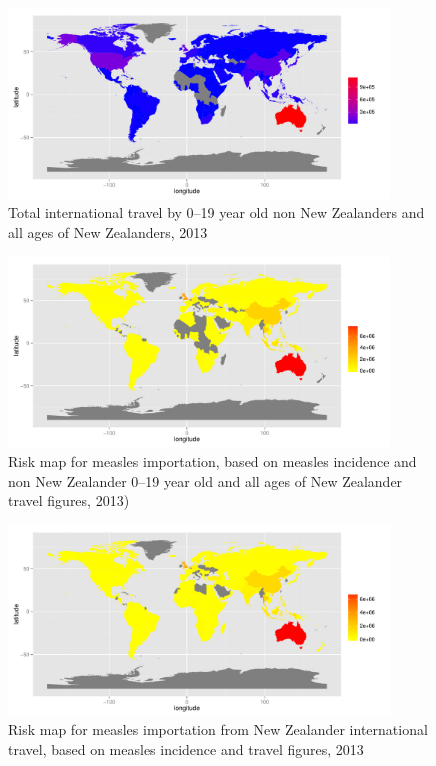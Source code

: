 \documentclass{article}
\begin{document}
\begin{figure}
\begin{center}
     \includegraphics[width=0.9\textwidth]{2013totnp1.pdf}
\end{center}
\caption{Total international travel by 0--19 year old non New Zealanders and all ages of New Zealanders, 2013}
\label{fig:travel12}
\end{figure}

\begin{figure}
\begin{center}
     \includegraphics[width=0.9\textwidth]{2013totnp4.pdf}
\end{center}
\caption{Risk map for measles importation, based on measles incidence and non New Zealander 0--19 year old and all ages of New Zealander travel figures, 2013)}
\label{fig:risk12}
\end{figure}

\begin{figure}
\begin{center}
     \includegraphics[width=0.9\textwidth]{2013nznp4.pdf}
\end{center}
\caption{Risk map for measles importation from New Zealander international travel, based on measles incidence and travel figures, 2013}
\label{fig:nzrisk12}
\end{figure}
\end{document}
